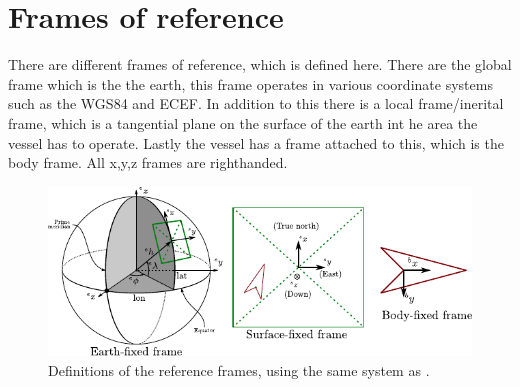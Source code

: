 \section{Frames of reference}
There are different frames of reference, which is defined here. There are the global frame which is the the earth, this frame operates in various coordinate systems such as the \ac{WGS84} and \ac{ECEF}. In addition to this there is a local frame/inerital frame, which is a tangential plane on the surface of the earth int he area the vessel has to operate. Lastly the vessel has a frame attached to this, which is the body frame. All x,y,z frames are righthanded.

\begin{figure}[htbp]
	\centering
	\includegraphics[width=\textwidth]{img/reference_frames}
	\caption{Definitions of the reference frames, using the same system as \cite{argo}.}
	\label{fig:vessel-block-overview}
\end{figure}


